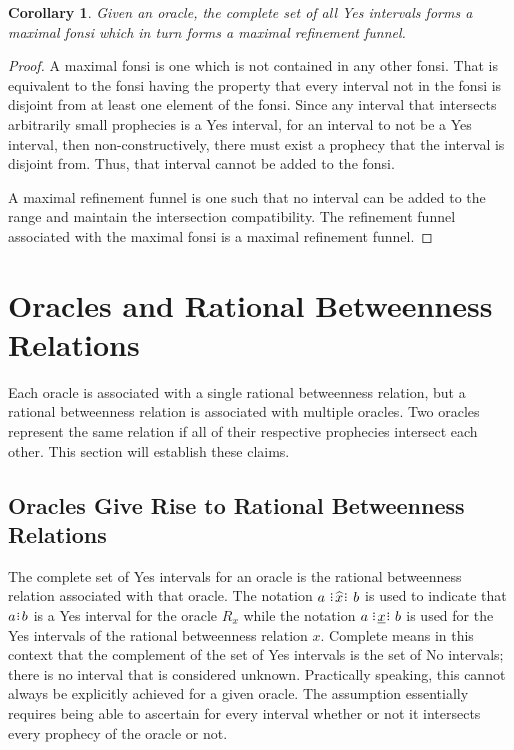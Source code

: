 \documentclass[12pt]{article}
\newtheorem{corollary}{Corollary}[section]
\begin{document}
\begin{corollary}
    Given an oracle, the complete set of all Yes intervals forms a maximal fonsi which in turn forms a maximal refinement funnel.
\end{corollary}

\begin{proof}
A maximal fonsi is one which is not contained in any other fonsi. That is equivalent to the fonsi having the property that every interval not in the fonsi is disjoint from at least one element of the fonsi. Since any interval that intersects arbitrarily small prophecies is a Yes interval, for an interval to not be a Yes interval, then non-constructively, there must exist a prophecy that the interval is disjoint from. Thus, that interval cannot be added to the fonsi. 

A maximal refinement funnel is one such that no interval can be added to the range and maintain the intersection compatibility. The refinement funnel associated with the maximal fonsi is a maximal refinement funnel. 

\end{proof}



\section{Oracles and Rational Betweenness Relations}

Each oracle is associated with a single rational betweenness relation, but a rational betweenness relation is associated with multiple oracles. Two oracles represent the same relation if all of their respective prophecies intersect each other. This section will establish these claims. 

\subsection{Oracles Give Rise to Rational Betweenness Relations}

The complete set of Yes intervals for an oracle is the rational betweenness relation associated with that oracle. The notation $a \xora b$ is used to indicate that $a\rint b$ is a Yes interval for the oracle $R_x$ while the notation $a \xrel b$ is used for the Yes intervals of the rational betweenness relation $x$. Complete means in this context that the complement of the set of Yes intervals is the set of No intervals; there is no interval that is considered unknown. Practically speaking, this cannot always be explicitly achieved for a given oracle. The assumption essentially requires being able to ascertain for every interval whether or not it intersects every prophecy of the oracle or not. 
\end{document}
